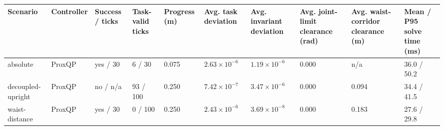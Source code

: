 \begin{tabular}{llllllllll}
\toprule
Scenario & Controller & Success / ticks & Task-valid ticks & Progress (m) & Avg. task deviation & Avg. invariant deviation & Avg. joint-limit clearance (rad) & Avg. waist-corridor clearance (m) & Mean / P95 solve time (ms) \\
\midrule
absolute & ProxQP & yes / 30 & 6 / 30 & 0.075 & $2.63\times 10^{-6}$ & $1.19\times 10^{-6}$ & 0.000 & n/a & 36.0 / 50.2 \\
decoupled-upright & ProxQP & no / n/a & 93 / 100 & 0.250 & $7.42\times 10^{-7}$ & $3.47\times 10^{-6}$ & 0.000 & 0.094 & 34.4 / 41.5 \\
waist-distance & ProxQP & yes / 30 & 0 / 100 & 0.250 & $2.43\times 10^{-6}$ & $3.69\times 10^{-8}$ & 0.000 & 0.183 & 27.6 / 29.8 \\
\bottomrule
\end{tabular}
